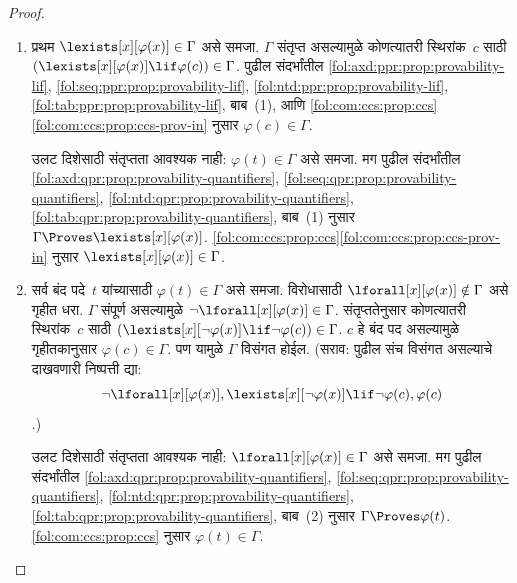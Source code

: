 \begin{proof}
  \begin{enumerate}
  \item
    प्रथम $\lexists[x][\varphi(x)]
      \in \Gamma$ असे समजा. $\Gamma$ संतृप्त असल्यामुळे कोणत्यातरी
      स्थिरांक~$c$ साठी
      $(\lexists[x][\varphi(x)] \lif \varphi(c)) \in \Gamma$. पुढील संदर्भांतील
      \ref{fol:axd:ppr:prop:provability-lif}, \ref{fol:seq:ppr:prop:provability-lif}, \ref{fol:ntd:ppr:prop:provability-lif}, \ref{fol:tab:ppr:prop:provability-lif},
      बाब~(1), आणि
      \ref{fol:com:ccs:prop:ccs}\ref{fol:com:ccs:prop:ccs-prov-in} नुसार $\varphi(c)
      \in \Gamma$.

    उलट दिशेसाठी संतृप्तता आवश्यक नाही: $\varphi(t) \in \Gamma$ असे समजा.
    मग पुढील संदर्भांतील
      \ref{fol:axd:qpr:prop:provability-quantifiers}, \ref{fol:seq:qpr:prop:provability-quantifiers}, \ref{fol:ntd:qpr:prop:provability-quantifiers}, \ref{fol:tab:qpr:prop:provability-quantifiers},
      बाब~(1) नुसार $\Gamma \Proves \lexists[x][\varphi(x)]$.
    \ref{fol:com:ccs:prop:ccs}\ref{fol:com:ccs:prop:ccs-prov-in} नुसार
    $\lexists[x][\varphi(x)] \in \Gamma$.
  \item
    सर्व बंद पदे~$t$ यांच्यासाठी
      $\varphi(t) \in \Gamma$ असे समजा. विरोधासाठी
      $\lforall[x][\varphi(x)] \notin \Gamma$ असे गृहीत धरा. $\Gamma$ संपूर्ण
      असल्यामुळे $\lnot\lforall[x][\varphi(x)] \in \Gamma$. संतृप्ततेनुसार
      कोणत्यातरी स्थिरांक~$c$ साठी
      $(\lexists[x][\lnot \varphi(x)] \lif \lnot \varphi(c)) \in
        \Gamma$. $c$ हे बंद पद असल्यामुळे गृहीतकानुसार $\varphi(c) \in
      \Gamma$. पण यामुळे $\Gamma$ विसंगत होईल. (सराव: पुढील संच विसंगत
      असल्याचे दाखवणारी निष्पत्ती द्या:
      \[      \lnot \lforall[x][\varphi(x)],
      \lexists[x][\lnot \varphi(x)] \lif \lnot
        \varphi(c), \varphi(c)
      \]
      .)

      उलट दिशेसाठी संतृप्तता आवश्यक नाही:
      $\lforall[x][\varphi(x)] \in \Gamma$ असे समजा. मग पुढील संदर्भांतील
      \ref{fol:axd:qpr:prop:provability-quantifiers}, \ref{fol:seq:qpr:prop:provability-quantifiers}, \ref{fol:ntd:qpr:prop:provability-quantifiers}, \ref{fol:tab:qpr:prop:provability-quantifiers},
      बाब~(2) नुसार $\Gamma \Proves \varphi(t)$. \ref{fol:com:ccs:prop:ccs}
      नुसार $\varphi(t) \in \Gamma$.
  \end{enumerate}
\end{proof}












